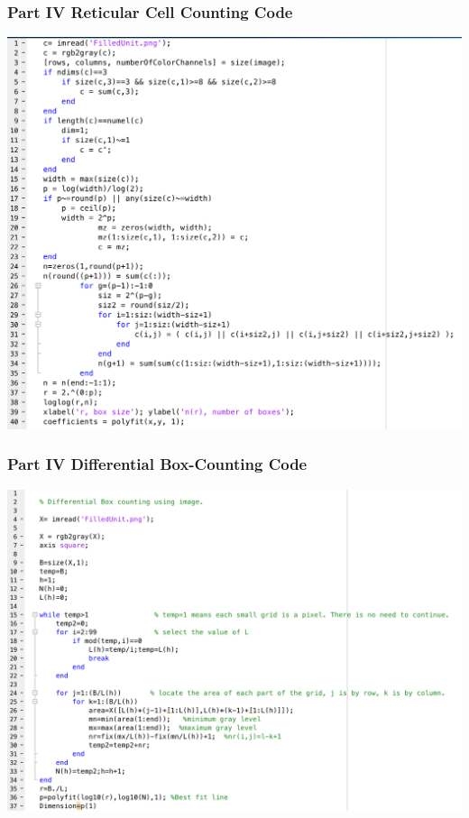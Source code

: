\documentclass[11pt]{article}
\theoremstyle{plain}
\theoremstyle{definition}
\begin{document}
\subsubsection*{Part IV Reticular Cell Counting Code}
\includegraphics*[scale = 0.35]{Part4aCode.png}
\subsubsection*{Part IV Differential Box-Counting Code}
\includegraphics*[scale = 0.35]{Part4bCode.png}
\end{document}
